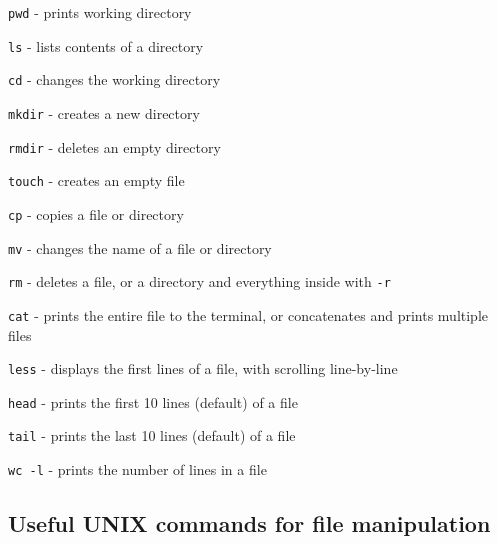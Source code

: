\documentclass[]{book}
\begin{document}
\texttt{pwd} - prints working directory

\texttt{ls} - lists contents of a directory

\texttt{cd} - changes the working directory

\texttt{mkdir} - creates a new directory

\texttt{rmdir} - deletes an empty directory

\texttt{touch} - creates an empty file

\texttt{cp} - copies a file or directory

\texttt{mv} - changes the name of a file or directory

\texttt{rm} - deletes a file, or a directory and everything inside with \texttt{-r}

\texttt{cat} - prints the entire file to the terminal, or concatenates and prints multiple files

\texttt{less} - displays the first lines of a file, with scrolling line-by-line

\texttt{head} - prints the first 10 lines (default) of a file

\texttt{tail} - prints the last 10 lines (default) of a file

\texttt{wc\ -l} - prints the number of lines in a file

\hypertarget{useful-unix-commands-for-file-manipulation}{%
\subsection{Useful UNIX commands for file manipulation}\label{useful-unix-commands-for-file-manipulation}}
\end{document}
